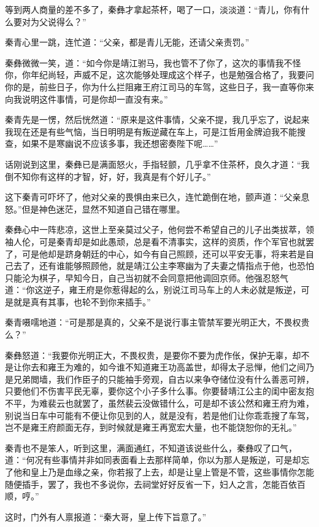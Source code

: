 等到两人商量的差不多了，秦彝才拿起茶杯，喝了一口，淡淡道：“青儿，你有什么要对为父说得么？”

秦青心里一跳，连忙道：“父亲，都是青儿无能，还请父亲责罚。”

秦彝微微一笑，道：“如今你是靖江驸马，我也管不了你了，这次的事情我不怪你，你年纪尚轻，声威不足，这次能够处理成这个样子，也是勉强合格了，我要问你的是，前些日子，你为什么拦阻雍王府江司马的车驾，这些日子，我一直等你来向我说明这件事情，可是你却一直没有来。”

秦青先是一愣，然后恍然道：“原来是这件事情，父亲不提，我几乎忘了，说起来我现在还是有些气恼，当日明明是有叛逆藏在车上，可是江哲用金牌迫我不能搜查，如果不是寒幽说不应该多事，我还想密奏陛下呢……”

话刚说到这里，秦彝已是满面怒火，手指轻颤，几乎拿不住茶杯，良久才道：“我倒不知你有这样的才智，好，好，我真是有个好儿子。”

这下秦青可吓坏了，他对父亲的畏惧由来已久，连忙跪倒在地，颤声道：“父亲息怒。”但是神色迷茫，显然不知道自己错在哪里。

秦彝心中一阵悲凉，这世上至亲莫过父子，他何尝不希望自己的儿子出类拔萃，领袖人伦，可是秦青却是如此愚顽，总是看不清事实，这样的资质，作个军官也就罢了，可是他却是跻身朝廷的中心，如今有自己照顾，还可以平安无事，将来若是自己去了，还有谁能够照顾他，就是靖江公主李寒幽为了夫妻之情指点于他，也恐怕只能沦为棋子，早知今日，自己当初就不会同意把他调回京师。他强忍怒气道：“你这逆子，雍王府是你惹得起的么，别说江司马车上的人未必就是叛逆，可是就是真有其事，也轮不到你来插手。”

秦青嗫嚅地道：“可是那是真的，父亲不是说行事主管禁军要光明正大，不畏权贵么？”

秦彝怒道：“我要你光明正大，不畏权贵，是要你不要为虎作伥，保护无辜，却不是让你去和雍王为难的，如今谁不知道雍王功高盖世，却得太子忌惮，他们之间乃是兄弟閲墙，我们作臣子的只能袖手旁观，自古以来争夺储位没有什么善恶可辨，只要他们不伤害平民无辜，要你这个小子多什么事。你要替靖江公主的闺中密友抱不平，为难裴云也就罢了，虽然裴云没做错什么，可是却不该公然和雍王府为难，别说当日车中可能有不便让你见到的人，就是没有，若是他们让你乖乖搜了车驾，岂不是雍王府颜面无存，到时候就是雍王再宽宏大量，也不能饶恕你的无礼。”

秦青也不是笨人，听到这里，满面通红，不知道该说些什么，秦彝叹了口气，道：“何况有些事情并非如同表面看上去那样简单，你以为那人是叛逆，可是却忘了他和皇上乃是血缘之亲，你若报了上去，却是让皇上管是不管，这些事情你怎能随便插手，罢了，我也不多说你，去祠堂好好反省一下，妇人之言，怎能百依百顺，哼。”

这时，门外有人禀报道：“秦大哥，皇上传下旨意了。”

